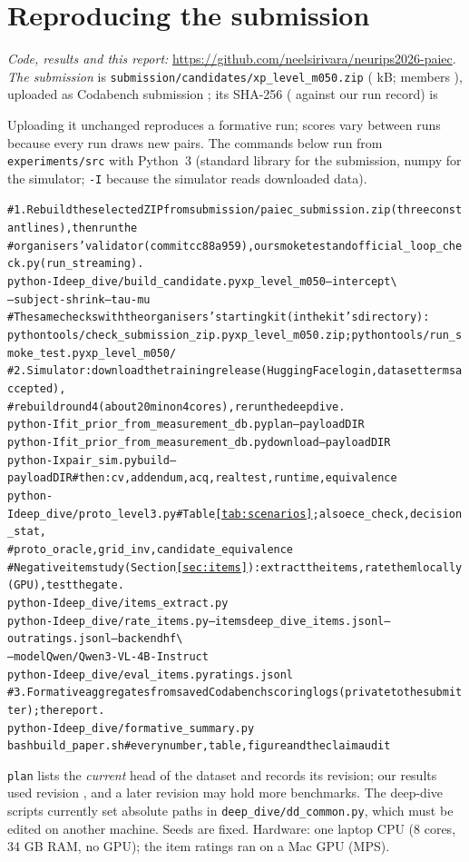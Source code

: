\documentclass{article}
\newcommand{\codeurl}{\url{https://github.com/neelsirivara/neurips2026-paiec}}
\begin{document}
\section{Reproducing the submission}
\label{sec:repro}

\emph{Code, results and this report:} \codeurl. \emph{The submission} is \texttt{submission/candidates/xp\_level\_m050.zip} (\SelZipKB{} kB; members \SelMembers), uploaded as Codabench submission \SelId; its SHA-256 (\SelShaVerified{} against our run record) is
\begin{center}\footnotesize\texttt{\SelZipSha}\end{center}
Uploading it unchanged reproduces a formative run; scores vary between runs because every run draws new pairs. The commands below run from \texttt{experiments/src} with Python~3 (standard library for the submission, numpy for the simulator; \texttt{-I} because the simulator reads downloaded data).
\begin{alltt}\scriptsize
# 1. Rebuild the selected ZIP from submission/paiec_submission.zip (three constant lines), then run the
#    organisers' validator (commit cc88a959), our smoke test and official_loop_check.py (run_streaming).
python -I deep_dive/build_candidate.py xp_level_m050 --intercept \SelInterceptRaw \textbackslash
       --subject-shrink \SelSubjectShrinkRaw --tau-mu \SelTauMuRaw
#    The same checks with the organisers' starting kit (in the kit's directory):
python tools/check_submission_zip.py xp_level_m050.zip;  python tools/run_smoke_test.py xp_level_m050/
# 2. Simulator: download the training release (Hugging Face login, dataset terms accepted),
#    rebuild round 4 (about 20 min on 4 cores), rerun the deep dive.
python -I fit_prior_from_measurement_db.py plan --payload DIR
python -I fit_prior_from_measurement_db.py download --payload DIR
python -I xpair_sim.py build --payload DIR   # then: cv, addendum, acq, realtest, runtime, equivalence
python -I deep_dive/proto_level3.py          # Table \ref{tab:scenarios}; also ece_check, decision_stat,
                                             # proto_oracle, grid_inv, candidate_equivalence
# Negative item study (Section \ref{sec:items}): extract the items, rate them locally (GPU), test the gate.
python -I deep_dive/items_extract.py
python -I deep_dive/rate_items.py --items deep_dive_items.jsonl --out ratings.jsonl --backend hf \textbackslash
       --model Qwen/Qwen3-VL-4B-Instruct
python -I deep_dive/eval_items.py ratings.jsonl
# 3. Formative aggregates from saved Codabench scoring logs (private to the submitter); the report.
python -I deep_dive/formative_summary.py
bash build_paper.sh                          # every number, table, figure and the claim audit
\end{alltt}
\texttt{plan} lists the \emph{current} head of the dataset and records its revision; our results used revision \texttt{\FitRevisionShort}, and a later revision may hold more benchmarks. The deep-dive scripts currently set absolute paths in \texttt{deep\_dive/dd\_common.py}, which must be edited on another machine. Seeds are fixed. Hardware: one laptop CPU (8 cores, 34 GB RAM, no GPU); the item ratings ran on a Mac GPU (MPS).
\end{document}
